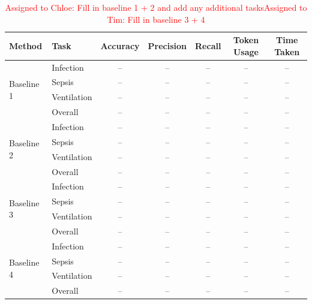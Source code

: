\begin{table}[h]
\centering
\begin{tabular}{llccccc}
\toprule
Method & Task & Accuracy & Precision & Recall & Token Usage & Time Taken \\
\midrule

\multirow{4}{*}{Baseline 1}
 & Infection & -- & -- & -- & -- & -- \\
 & Sepsis & -- & -- & -- & -- & -- \\
 & Ventilation & -- & -- & -- & -- & -- \\
 & Overall & -- & -- & -- & -- & -- \\
\midrule

\multirow{4}{*}{Baseline 2}
 & Infection & -- & -- & -- & -- & -- \\
 & Sepsis & -- & -- & -- & -- & -- \\
 & Ventilation & -- & -- & -- & -- & -- \\
 & Overall & -- & -- & -- & -- & -- \\
\midrule

\multirow{4}{*}{Baseline 3}
 & Infection & -- & -- & -- & -- & -- \\
 & Sepsis & -- & -- & -- & -- & -- \\
 & Ventilation & -- & -- & -- & -- & -- \\
 & Overall & -- & -- & -- & -- & -- \\
\midrule

\multirow{4}{*}{Baseline 4}
 & Infection & -- & -- & -- & -- & -- \\
 & Sepsis & -- & -- & -- & -- & -- \\
 & Ventilation & -- & -- & -- & -- & -- \\
 & Overall & -- & -- & -- & -- & -- \\
\bottomrule
\end{tabular}
\caption{\textcolor{red}{Assigned to Chloe: Fill in baseline 1 + 2 and add any additional tasks}\textcolor{red}{Assigned to Tim: Fill in baseline 3 + 4}}
\label{tab:baseline_results}
\end{table}

